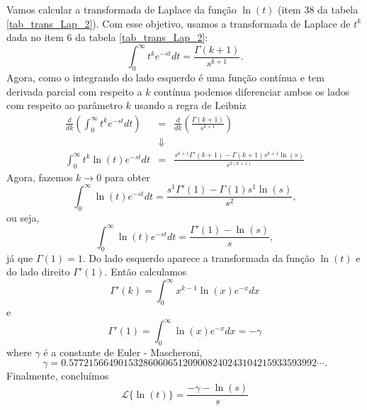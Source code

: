 \begin{ex}Vamos calcular a transformada de Laplace da função $\ln(t)$ (item 38 da tabela \ref{tab_trans_Lap_2}). Com esse objetivo, usamos a transformada de Laplace de $t^k$ dada no item 6 da tabela \ref{tab_trans_Lap_2}:
\begin{equation}
\int_0^\infty t^ke^{-st}dt=\frac{\Gamma(k+1)}{s^{k+1}}.
\end{equation}
Agora, como o integrando do lado esquerdo é uma função contínua e tem derivada parcial com respeito a $k$ contínua podemos diferenciar ambos os lados com respeito ao parâmetro $k$ usando a regra de Leibniz
\begin{eqnarray*}
\frac{d}{dk}\left(\int_0^\infty t^ke^{-st}dt\right)&=&\frac{d}{dk}\left(\frac{\Gamma(k+1)}{s^{k+1}}\right)\\
&\Downarrow&\\
\int_0^\infty t^k \ln(t) e^{-st}dt&=&\frac{s^{k+1}\Gamma'(k+1)-\Gamma(k+1)s^{k+1}\ln(s)}{s^{2(k+1)}}
\end{eqnarray*}
Agora, fazemos $k\to 0$ para obter
\begin{equation}
\int_0^\infty \ln(t) e^{-st}dt=\frac{s^{1}\Gamma'(1)-\Gamma(1)s^{1}\ln(s)}{s^{2}},
\end{equation}
ou seja,
\begin{equation}
\int_0^\infty \ln(t) e^{-st}dt=\frac{\Gamma'(1)-\ln(s)}{s},
\end{equation}
já que $\Gamma(1)=1$. Do lado esquerdo aparece a transformada da função $\ln(t)$ e do lado direito $\Gamma'(1)$. Então calculamos
\begin{equation}
\Gamma'(k)=\int_0^\infty x^{k-1}\ln(x) e^{-x}dx
\end{equation}
e
\begin{equation}
\Gamma'(1)=\int_0^\infty \ln(x) e^{-x} dx=-\gamma
\end{equation}
where $\gamma$ é a constante de Euler - Mascheroni,
\begin{equation}
\gamma=0.57721566490153286060651209008240243104215933593992\cdots.
\end{equation}
Finalmente, concluímos
\begin{equation}
\mathcal{L}\{\ln(t)\}=\frac{-\gamma-\ln(s)}{s}
\end{equation}
\end{ex}

